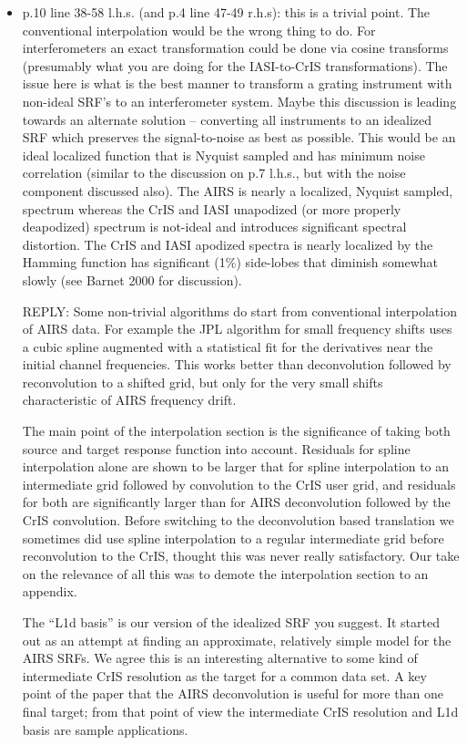 \documentclass[11pt]{article}
\newcommand {\reply} {\mbox{\small REPLY}}
\begin{document}
\begin{itemize}
\item p.10 line 38-58 l.h.s. (and p.4 line 47-49 r.h.s): this is a
  trivial point. The conventional interpolation would be the wrong
  thing to do. For interferometers an exact transformation could be
  done via cosine transforms (presumably what you are doing for the
  IASI-to-CrIS transformations). The issue here is what is the best
  manner to transform a grating instrument with non-ideal SRF’s to
  an interferometer system. Maybe this discussion is leading towards
  an alternate solution – converting all instruments to an idealized
  SRF which preserves the signal-to-noise as best as possible. This
  would be an ideal localized function that is Nyquist sampled and
  has minimum noise correlation (similar to the discussion on p.7
  l.h.s., but with the noise component discussed also). The AIRS is
  nearly a localized, Nyquist sampled, spectrum whereas the CrIS and
  IASI unapodized (or more properly deapodized) spectrum is
  not-ideal and introduces significant spectral distortion. The CrIS
  and IASI apodized spectra is nearly localized by the Hamming
  function has significant (1\%) side-lobes that diminish somewhat
  slowly (see Barnet 2000 for discussion).

  \reply: Some non-trivial algorithms do start from conventional
  interpolation of AIRS data.  For example the JPL algorithm for
  small frequency shifts uses a cubic spline augmented with a
  statistical fit for the derivatives near the initial channel
  frequencies.  This works better than deconvolution followed by
  reconvolution to a shifted grid, but only for the very small
  shifts characteristic of AIRS frequency drift.

  The main point of the interpolation section is the significance 
  of taking both source and target response function into account.
  Residuals for spline interpolation alone are shown to be larger
  that for spline interpolation to an intermediate grid followed by
  convolution to the CrIS user grid, and residuals for both are
  significantly larger than for AIRS deconvolution followed by the
  CrIS convolution.  Before switching to the deconvolution based
  translation we sometimes did use spline interpolation to a regular
  intermediate grid before reconvolution to the CrIS, thought this
  was never really satisfactory.  Our take on the relevance of all
  this was to demote the interpolation section to an appendix.
  
  The ``L1d basis'' is our version of the idealized SRF you suggest.
  It started out as an attempt at finding an approximate, relatively
  simple model for the AIRS SRFs.  We agree this is an interesting
  alternative to some kind of intermediate CrIS resolution as the
  target for a common data set.  A key point of the paper that the
  AIRS deconvolution is useful for more than one final target; from
  that point of view the intermediate CrIS resolution and L1d basis
  are sample applications.

\end{itemize}
\end{document}
